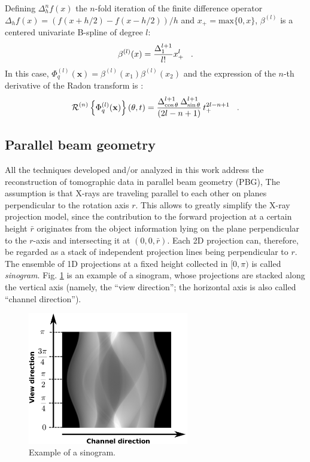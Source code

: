 {Defining $\Delta_{h}^{n}f(x)$ the $n$-fold iteration of the finite difference operator 
$\Delta_{h}f(x) = \left( f(x+h/2) - f(x-h/2) \right) / h$ and $x_{+} = \text{max}\{0,x\}$, $\beta^{(l)}$
is a centered univariate B-spline of degree $l$:
\begin{equation}
  \beta^{(l)}(x) = \frac{\Delta_{1}^{l+1}}{l!} x_{+}^{l}\hspace{0.3cm}.
\end{equation}
In this case, $\Phi_{q}^{(l)}(\mathbf{x}) = \beta^{(l)}(x_{1})\beta^{(l)}(x_{2})$ and the expression of the $n$-th derivative of the 
Radon transform is \cite{Horbelt2002,Nilchian2013}:
\begin{equation}
  \operatorname{\mathcal{R}}^{(n)}\left\{\Phi_{q}^{(l)}(\mathbf{x})\right\}(\theta,t) = \frac{\Delta_{\cos\theta}^{l+1}\:\Delta_{\sin\theta}^{l+1}}{(2l-n+1)}\,
  t_{+}^{2l-n+1} \hspace{0.3cm}.
\end{equation}


\subsection{Parallel beam geometry}
\label{introduction:radon-transform:geometry}
 All the techniques developed and/or analyzed in this work address the reconstruction of tomographic data in parallel beam geometry (PBG),
 The assumption is that X-rays are traveling parallel to each other
on planes perpendicular to the rotation axis $r$. This allows to greatly simplify the X-ray projection model, since the contribution to
the forward projection at a certain height $\bar{r}$ originates from the object information lying on the plane perpendicular to
the $r$-axis and intersecting it at $(0,0,\bar{r})$. Each 2D projection can, therefore, be regarded as a stack of independent projection lines
being perpendicular to $r$. The ensemble of 1D projections at a fixed height collected in $[0,\pi)$ is called \emph{sinogram}.
Fig. \ref{introduction:radon-transform:sinogram} is an example of a sinogram, whose projections are stacked along the vertical axis
(namely, the ``view direction''; the horizontal axis is also called ``channel direction'').
\begin{figure}[!h]
    \centering
    \includegraphics[width=7cm]{images/introduction_radon_transform_sinogram.pdf}   
   \caption[Example of a sinogram.]{Example of a sinogram.}
    \label{introduction:radon-transform:sinogram}
\end{figure}

}
